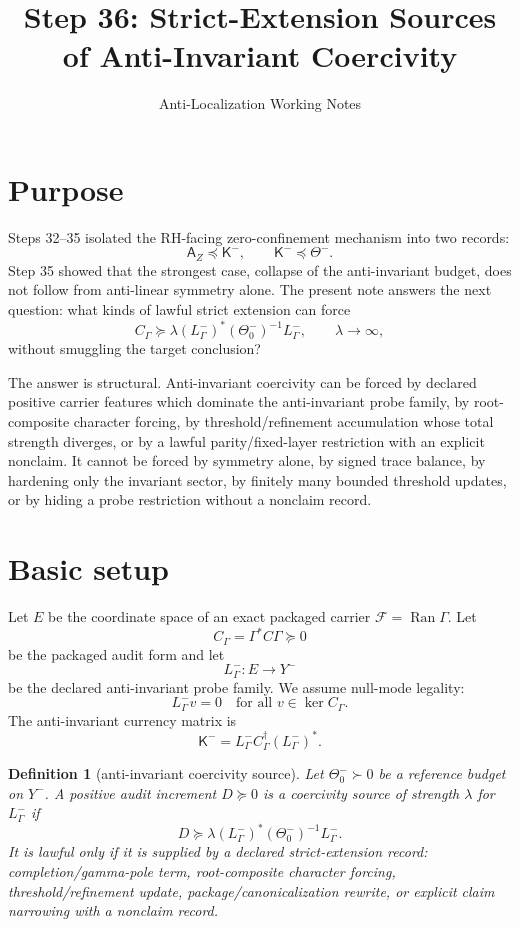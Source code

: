 \documentclass[11pt]{article}
\title{Step 36: Strict-Extension Sources of Anti-Invariant Coercivity}
\author{Anti-Localization Working Notes}
\date{}
\newtheorem{definition}[theorem]{Definition}
\DeclareMathOperator{\Ran}{Ran}
\begin{document}
\maketitle

\section{Purpose}
Steps 32--35 isolated the RH-facing zero-confinement mechanism into two records:
\[
  \mathsf A_Z\preceq \mathsf K^-,
  \qquad
  \mathsf K^-\preceq \Theta^-.
\]
Step 35 showed that the strongest case, collapse of the anti-invariant budget, does not follow from anti-linear symmetry alone.  The present note answers the next question: what kinds of lawful strict extension can force
\[
  C_\Gamma \succeq
  \lambda (L^-_\Gamma)^*(\Theta^-_0)^{-1}L^-_\Gamma,
  \qquad \lambda\to\infty,
\]
without smuggling the target conclusion?

The answer is structural.  Anti-invariant coercivity can be forced by declared positive carrier features which dominate the anti-invariant probe family, by root-composite character forcing, by threshold/refinement accumulation whose total strength diverges, or by a lawful parity/fixed-layer restriction with an explicit nonclaim.  It cannot be forced by symmetry alone, by signed trace balance, by hardening only the invariant sector, by finitely many bounded threshold updates, or by hiding a probe restriction without a nonclaim record.

\section{Basic setup}
Let \(E\) be the coordinate space of an exact packaged carrier \(\mathcal F=\Ran\Gamma\).  Let
\[
  C_\Gamma=\Gamma^*C\Gamma\succeq0
\]
be the packaged audit form and let
\[
  L^-_\Gamma:E\to Y^-
\]
be the declared anti-invariant probe family.  We assume null-mode legality:
\[
  L^-_\Gamma v=0
  \quad\text{for all }v\in\ker C_\Gamma.
\]
The anti-invariant currency matrix is
\[
  \mathsf K^-
  =L^-_\Gamma C_\Gamma^\dagger (L^-_\Gamma)^*.
\]

\begin{definition}[anti-invariant coercivity source]
Let \(\Theta^-_0\succ0\) be a reference budget on \(Y^-\).  A positive audit increment \(D\succeq0\) is a \emph{coercivity source of strength \(\lambda\)} for \(L^-_\Gamma\) if
\[
  D\succeq \lambda (L^-_\Gamma)^*(\Theta^-_0)^{-1}L^-_\Gamma.
\]
It is \emph{lawful} only if it is supplied by a declared strict-extension record: completion/gamma-pole term, root-composite character forcing, threshold/refinement update, package/canonicalization rewrite, or explicit claim narrowing with a nonclaim record.
\end{definition}
\end{document}
